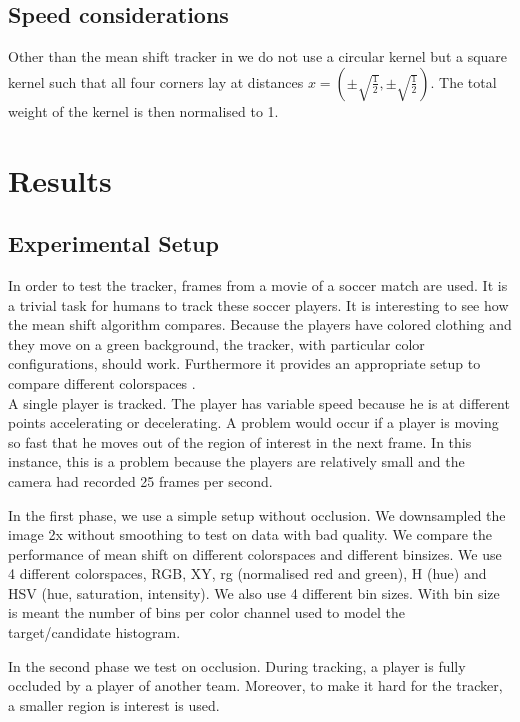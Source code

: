 \documentclass[a4paper,11pt]{article}
\begin{document}
\subsection{Speed considerations}



Other than the mean shift tracker in \cite{mean_shift} we do not use a circular kernel but a square kernel such that all four corners lay at distances $x=(\pm \sqrt{\frac{1}{2}},\pm \sqrt{\frac{1}{2}})$. The total weight of the kernel is then normalised to 1.

\section{Results} 

	\subsection{Experimental Setup} 
	In order to test the tracker, frames from a movie of a soccer match are used.  It is
	a trivial task for humans to track these soccer players. It is interesting to
	see how the mean shift algorithm compares.  
	Because the players have colored clothing and they move on a green background, the tracker, with particular color configurations, should work. Furthermore it provides an appropriate setup to compare different
	colorspaces .\\

	A single player is tracked. The player has variable speed because he is
	at different points accelerating or decelerating. A problem would occur if a player is moving so fast
	that he moves out of the region of interest in the next frame. In this instance, this is a problem because the players are relatively small and the camera had recorded 25
	frames per second.
	
	In the first phase, we use a simple setup without occlusion. We downsampled
	the image 2x without smoothing to test on data with bad quality.  We compare
	the performance of mean shift on different colorspaces and different
	binsizes.  We use 4 different colorspaces, RGB, XY, rg (normalised red and
	green), H (hue) and HSV (hue, saturation, intensity). We also use 4 different bin sizes. With bin size is meant the number of bins per color channel used to model the
	target/candidate histogram.

	In the second phase we test on occlusion. During tracking, a player is fully
	occluded by a player of another team. Moreover, to make it hard for the tracker, a smaller region is interest is used. 
\end{document}
